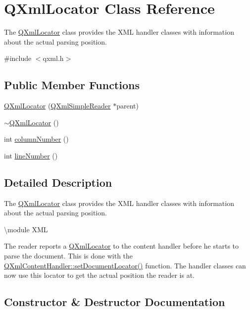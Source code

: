 \hypertarget{class_q_xml_locator}{}\section{Q\+Xml\+Locator Class Reference}
\label{class_q_xml_locator}


The \mbox{\hyperlink{class_q_xml_locator}{Q\+Xml\+Locator}} class provides the X\+ML handler classes with information about the actual parsing position.  




{\ttfamily \#include $<$qxml.\+h$>$}

\subsection*{Public Member Functions}
\begin{DoxyCompactItemize}
\item 
\mbox{\hyperlink{class_q_xml_locator_a0912b20182876aa1f1b1d2f8c39b69d6}{Q\+Xml\+Locator}} (\mbox{\hyperlink{class_q_xml_simple_reader}{Q\+Xml\+Simple\+Reader}} $\ast$parent)
\item 
\mbox{\hyperlink{class_q_xml_locator_a5c25ab17eea78be183aab4ff21ce3c17}{$\sim$\+Q\+Xml\+Locator}} ()
\item 
int \mbox{\hyperlink{class_q_xml_locator_a5f4b33431fe65b3fb4fa4f822aa384f4}{column\+Number}} ()
\item 
int \mbox{\hyperlink{class_q_xml_locator_ac595643330832dfa1222eac90ebc5fe7}{line\+Number}} ()
\end{DoxyCompactItemize}


\subsection{Detailed Description}
The \mbox{\hyperlink{class_q_xml_locator}{Q\+Xml\+Locator}} class provides the X\+ML handler classes with information about the actual parsing position. 

\textbackslash{}module X\+ML

The reader reports a \mbox{\hyperlink{class_q_xml_locator}{Q\+Xml\+Locator}} to the content handler before he starts to parse the document. This is done with the \mbox{\hyperlink{class_q_xml_content_handler_a89863bd9a6372d3d73086aa99107bca7}{Q\+Xml\+Content\+Handler\+::set\+Document\+Locator()}} function. The handler classes can now use this locator to get the actual position the reader is at. 

\subsection{Constructor \& Destructor Documentation}
\mbox{\label{class_q_xml_locator_a0912b20182876aa1f1b1d2f8c39b69d6}} 
